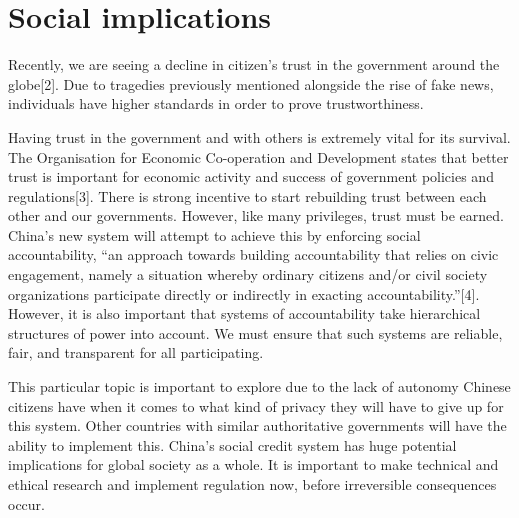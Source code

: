 \documentclass[letterpaper, 10 pt, conference]{ieeeconf}  %
\begin{document}



\section{Social implications}
Recently, we are seeing a decline in citizen’s trust in the government around the globe[2]. Due to tragedies previously mentioned alongside the rise of fake news, individuals have higher standards in order to prove trustworthiness. 

Having trust in the government and with others is extremely vital for its survival. The Organisation for Economic Co-operation and Development states that better trust is important for economic activity and success of government policies and regulations[3].  There is strong incentive to start rebuilding trust between each other and our governments. However, like many privileges, trust must be earned. China’s new system will attempt to achieve this by enforcing social accountability, “an approach towards building accountability that relies on civic engagement, namely a situation whereby ordinary citizens and/or civil society organizations participate directly or indirectly in exacting accountability.”[4]. However, it is also important that systems of accountability take hierarchical structures of power into account. We must ensure that such systems are reliable, fair, and transparent for all participating.

This particular topic is important to explore due to the lack of autonomy Chinese citizens have when it comes to what kind of privacy they will have to give up for this system. Other countries with similar authoritative governments will have the ability to implement this. China’s social credit system has huge potential implications for global society as a whole. It is important to make technical and ethical research and implement regulation now, before irreversible consequences occur.
\end{document}
